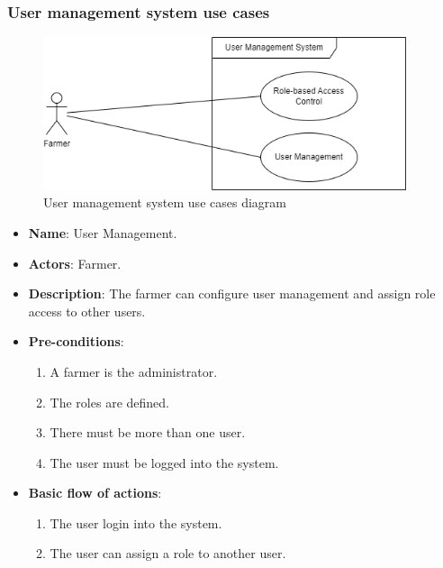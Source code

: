 \subsubsection*{User management system use cases}
\begin{figure}[H]
    \centering
    \includegraphics[width=0.95\textwidth]{./images/6/user_management_uses.png}
    \caption{User management system use cases diagram}
\end{figure}
\begin{itemize}
    \item \textbf{Name}: User Management.
    \item \textbf{Actors}: Farmer.
    \item \textbf{Description}: The farmer can configure user management and assign role access to other users.
    \item \textbf{Pre-conditions}:
        \begin{enumerate}
            \item A farmer is the administrator.
            \item The roles are defined.
            \item There must be more than one user.
            \item The user must be logged into the system.
        \end{enumerate}
    \item \textbf{Basic flow of actions}:
        \begin{enumerate}
            \item The user login into the system.
            \item The user can assign a role to another user.
        \end{enumerate}
\end{itemize}

